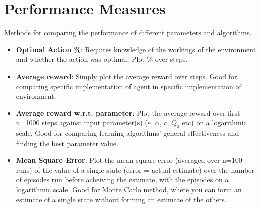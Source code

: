 \documentclass[12pt]{article}
\begin{document}
\section{Performance Measures}
Methods for comparing the performance of different parameters and algorithms.
\begin{itemize}
\item\textbf{Optimal Action \%}: Requires knowledge of the workings of the environment 
	and whether the action was optimal. Plot \% over steps.

\item\textbf{Average reward}: Simply plot the average reward over steps.
	Good for comparing specific implementation of agent in specific implementation of environment.

\item\textbf{Average reward w.r.t. parameter}: Plot the average reward over first n=1000 steps 
	against input parameter(s) ($\varepsilon$, $\alpha$, $c$, $Q_0$ etc) on a logarithmic scale.
	Good for comparing learning algorithms' general effectiveness and finding the best parameter value.

\item\textbf{Mean Square Error}: Plot the mean square error (averaged over n=100 runs) of the value of 
	a single state (error = actual-estimate) over the number of episodes run before acheiving the 
	estimate, with the episodes on a logarithmic scale. Good for Monte Carlo method, where you can form 
	an estimate of a single state without forming an estimate of the others.
\end{itemize}
\end{document}

